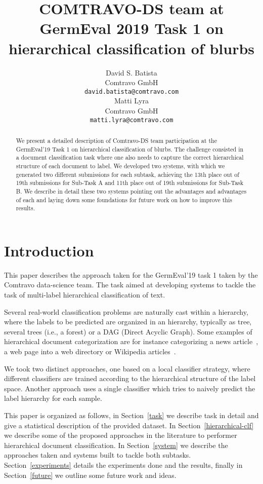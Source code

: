 \documentclass[11pt,a4paper]{article}
\title{COMTRAVO-DS team at GermEval 2019 Task 1 on hierarchical classification of blurbs}
\author{David S. Batista \\
  Comtravo GmbH \\
  {\tt david.batista@comtravo.com} \\\And
  Matti Lyra \\
  Comtravo GmbH \\
  {\tt matti.lyra@comtravo.com} \\}
\date{}
\begin{document}
\maketitle

\begin{abstract}
We present a detailed description of Comtravo-DS team participation at the
GermEval'19 Task 1 on hierarchical classification of blurbs. The challenge
consisted in a document classification task where one also needs to capture
the correct hierarchical structure of each document to label. We developed two
systems, with which we generated two different submissions for each subtask,
achieving the 13th place out of 19th submissions for Sub-Task A and 11th place
out of 19th submissions for Sub-Task B. We describe in detail these two
systems pointing out the advantages and advantages of each and laying down some
foundations for future work on how to improve this results.
\end{abstract}




\section{Introduction}

This paper describes the approach taken for the GermEval'19 task 1 taken by the
Comtravo data-science team. The task aimed at developing systems to tackle the
task of multi-label hierarchical classification of text.

Several real-world classification problems are naturally cast within a hierarchy,
where the labels to be predicted are organized in an hierarchy, typically as
tree, several trees (i.e., a forest) or a DAG (Direct Acyclic Graph). Some examples
of hierarchical document categorization are for instance categorizing a news
article~\cite{Lewis:2004:RNB:1005332.1005345}, a web page into a web directory
or Wikipedia articles~\cite{PartalasKBAPGAA15}.

We took two distinct approaches, one based on a local classifier strategy, where different classifiers
are trained according to the hierarchical structure of the label space. Another
approach uses a single classifier which tries to naively predict the label
hierarchy for each sample.

This paper is organized as follows, in Section~\ref{task} we describe task in
detail and give a statistical description of the provided dataset. In Section~\ref{hierarchical-clf}
we describe some of the proposed approaches in the literature to performer
hierarchical document classification. In Section~\ref{system} we describe
the approaches taken and systems built to tackle both subtasks. Section~\ref{experiments}
details the experiments done and the results, finally in Section~\ref{future} we
outline some future work and ideas.
\end{document}
